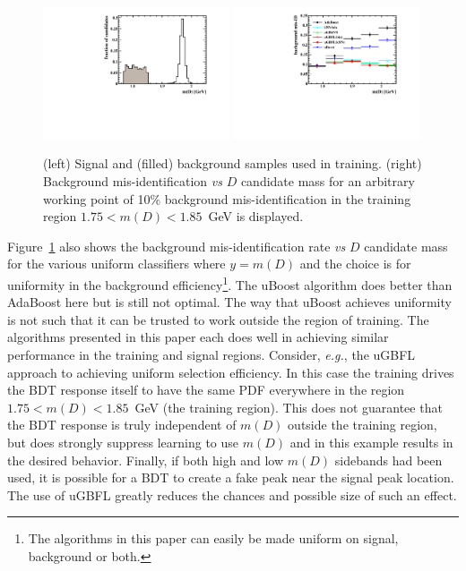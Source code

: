 \begin{figure}[] 
  \centering 
  \includegraphics[width=0.49\textwidth]{mD_train.pdf}
  \includegraphics[width=0.49\textwidth]{MD_eff.pdf}
  \caption{\label{fig:md_results} (left) Signal and (filled) background samples used in training.  (right) Background mis-identification {\em vs} $D$ candidate mass for an arbitrary working point of 10\% background mis-identification in the training region $1.75 < m(D) < 1.85$~GeV is displayed.}
\end{figure}

Figure~\ref{fig:md_results} also shows the background mis-identification rate {\em vs} $D$ candidate mass for the various uniform classifiers where $y = m(D)$ and the choice is for uniformity in the background efficiency\footnote{The algorithms in this paper can easily be made uniform on signal, background or both.}.  
The uBoost algorithm does better than AdaBoost here but is still not optimal.  The way that uBoost achieves uniformity is not such that it can be trusted to work outside the region of training.  The algorithms presented in this paper each does well in achieving similar performance in the training and signal regions.  
Consider, {\em e.g.}, the uGBFL approach to achieving uniform selection efficiency.  In this case the training drives the BDT response itself to have the same PDF everywhere in the region $1.75 < m(D) < 1.85$~GeV (the training region).  
This does not guarantee that the BDT response is truly independent of $m(D)$ outside the training region, but does strongly suppress learning to use $m(D)$ and in this example results in the desired behavior.  
Finally, if both high and low $m(D)$ sidebands had been used, it is possible for a BDT to create a fake peak near the signal peak location.  The use of uGBFL greatly reduces the chances and possible size of such an effect.


